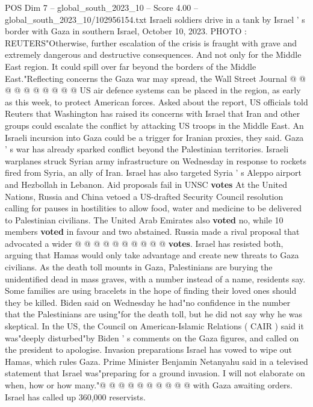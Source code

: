 \begin{textsample}{POS Dim 7 – global\_south\_2023\_10 – Score 4.00 – global\_south\_2023\_10/102956154.txt}
Israeli soldiers drive in a tank by Israel ' s border with Gaza in southern Israel, October 10, 2023.
PHOTO : REUTERS"Otherwise, further escalation of the crisis is fraught with grave and extremely dangerous and destructive consequences.
And not only for the Middle East region.
It could spill over far beyond the borders of the Middle East."Reflecting concerns the Gaza war may spread, the Wall Street Journal @ @ @ @ @ @ @ @ @ @ US air defence systems can be placed in the region, as early as this week, to protect American forces.
Asked about the report, US officials told Reuters that Washington has raised its concerns with Israel that Iran and other groups could escalate the conflict by attacking US troops in the Middle East.
An Israeli incursion into Gaza could be a trigger for Iranian proxies, they said.
Gaza ' s war has already sparked conflict beyond the Palestinian territories.
Israeli warplanes struck Syrian army infrastructure on Wednesday in response to rockets fired from Syria, an ally of Iran.
Israel has also targeted Syria ' s Aleppo airport and Hezbollah in Lebanon.
Aid proposals fail in UNSC \textbf{votes} At the United Nations, Russia and China vetoed a US-drafted Security Council resolution calling for pauses in hostilities to allow food, water and medicine to be delivered to Palestinian civilians.
The United Arab Emirates also \textbf{voted} no, while 10 members \textbf{voted} in favour and two abstained.
Russia made a rival proposal that advocated a wider @ @ @ @ @ @ @ @ @ @ \textbf{votes}.
Israel has resisted both, arguing that Hamas would only take advantage and create new threats to Gaza civilians.
As the death toll mounts in Gaza, Palestinians are burying the unidentified dead in mass graves, with a number instead of a name, residents say.
Some families are using bracelets in the hope of finding their loved ones should they be killed.
Biden said on Wednesday he had"no confidence in the number that the Palestinians are using"for the death toll, but he did not say why he was skeptical.
In the US, the Council on American-Islamic Relations ( CAIR ) said it was"deeply disturbed"by Biden ' s comments on the Gaza figures, and called on the president to apologise.
Invasion preparations Israel has vowed to wipe out Hamas, which rules Gaza.
Prime Minister Benjamin Netanyahu said in a televised statement that Israel was"preparing for a ground invasion.
I will not elaborate on when, how or how many."@ @ @ @ @ @ @ @ @ @ with Gaza awaiting orders.
Israel has called up 360,000 reservists.

\end{textsample}
